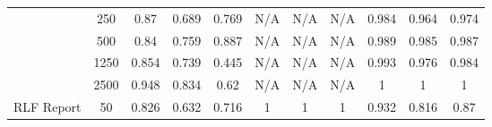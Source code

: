 \begin{table*}[]
{\begin{tabular}{ccccccccccc}
      \multicolumn{1}{|c|}{}                                            & \multicolumn{1}{c|}{250}           & \multicolumn{1}{c|}{0.87}                    & \multicolumn{1}{c|}{0.689}                & \multicolumn{1}{c|}{0.769}            & \multicolumn{1}{c|}{N/A}                      & \multicolumn{1}{c|}{N/A}                   & \multicolumn{1}{c|}{N/A}               & \multicolumn{1}{c|}{0.984}                  & \multicolumn{1}{c|}{0.964}               & \multicolumn{1}{c|}{0.974}           \\ \cline{2-11}
			\multicolumn{1}{|c|}{}                                            & \multicolumn{1}{c|}{500}           & \multicolumn{1}{c|}{0.84}                    & \multicolumn{1}{c|}{0.759}                & \multicolumn{1}{c|}{0.887}            & \multicolumn{1}{c|}{N/A}                      & \multicolumn{1}{c|}{N/A}                   & \multicolumn{1}{c|}{N/A}               & \multicolumn{1}{c|}{0.989}                  & \multicolumn{1}{c|}{0.985}               & \multicolumn{1}{c|}{0.987}           \\ \cline{2-11}
			\multicolumn{1}{|c|}{}                                            & \multicolumn{1}{c|}{1250}          & \multicolumn{1}{c|}{0.854}                   & \multicolumn{1}{c|}{0.739}                & \multicolumn{1}{c|}{0.445}            & \multicolumn{1}{c|}{N/A}                      & \multicolumn{1}{c|}{N/A}                   & \multicolumn{1}{c|}{N/A}               & \multicolumn{1}{c|}{0.993}                  & \multicolumn{1}{c|}{0.976}               & \multicolumn{1}{c|}{0.984}           \\ \cline{2-11}
			\multicolumn{1}{|c|}{}                                            & \multicolumn{1}{c|}{2500}          & \multicolumn{1}{c|}{0.948}                   & \multicolumn{1}{c|}{0.834}                & \multicolumn{1}{c|}{0.62}             & \multicolumn{1}{c|}{N/A}                      & \multicolumn{1}{c|}{N/A}                   & \multicolumn{1}{c|}{N/A}               & \multicolumn{1}{c|}{1}                      & \multicolumn{1}{c|}{1}                   & \multicolumn{1}{c|}{1}               \\ \hline
			\multicolumn{1}{|c|}{\multirow{6}{*}{RLF Report}}                 & \multicolumn{1}{c|}{50}            & \multicolumn{1}{c|}{0.826}                   & \multicolumn{1}{c|}{0.632}                & \multicolumn{1}{c|}{0.716}            & \multicolumn{1}{c|}{1}                        & \multicolumn{1}{c|}{1}                     & \multicolumn{1}{c|}{1}                 & \multicolumn{1}{c|}{0.932}                  & \multicolumn{1}{c|}{0.816}               & \multicolumn{1}{c|}{0.87}            \\ \cline{2-11}

\end{tabular}}
\end{table*}
